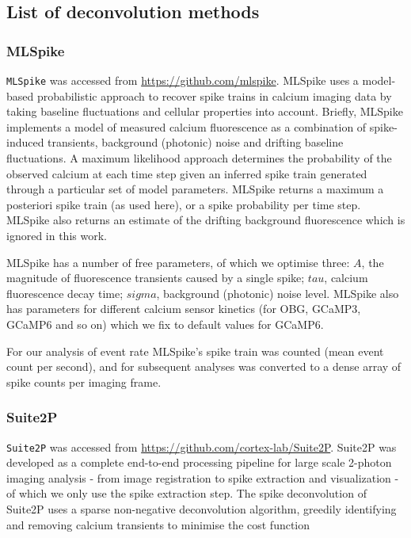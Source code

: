 \documentclass[a4paper,11pt]{article}
\begin{document}
\subsection*{List of deconvolution methods}

\subsubsection*{MLSpike}
\texttt{MLSpike} \citep{Deneux2016-gu} was accessed from \href{https://github.com/mlspike}{https://github.com/mlspike}. MLSpike uses a model-based probabilistic approach to recover spike trains in calcium imaging data by taking baseline fluctuations and cellular properties into account. Briefly, 
MLSpike implements a model of measured calcium fluorescence as a combination of spike-induced transients, background (photonic) noise and drifting baseline fluctuations. A maximum likelihood approach determines the probability of the observed calcium at each time step given an inferred spike train generated through a particular set of model parameters. MLSpike returns a maximum a posteriori spike train (as used here), or a spike probability per time step. MLSpike also returns an estimate of the drifting background fluorescence which is ignored in this work. 

MLSpike has a number of free parameters, of which we optimise three: $A$, the magnitude of fluorescence transients caused by a single spike; $tau$, calcium fluorescence decay time; $sigma$, background (photonic) noise level. MLSpike also has parameters for different calcium sensor kinetics (for OBG, GCaMP3, GCaMP6 and so on) which we fix to default values for GCaMP6. 

For our analysis of event rate MLSpike's spike train was counted (mean event count per second), and for subsequent analyses was converted to a dense array of spike counts per imaging frame.



\subsubsection*{Suite2P}
\texttt{Suite2P} \citep{Pachitariu2016-ui,Pachitariu2018-cj} was accessed from \href{https://github.com/cortex-lab/Suite2P}{https://github.com/cortex-lab/Suite2P}. Suite2P was developed as a complete end-to-end processing pipeline for large scale 2-photon imaging analysis - from image registration to spike extraction and visualization - of which we only use the spike extraction step. The spike deconvolution of Suite2P uses a sparse non-negative deconvolution algorithm, greedily identifying and removing calcium transients to minimise the cost function 
\end{document}
